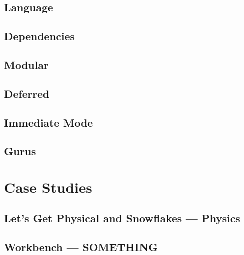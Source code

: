 \documentclass[conference,12pt]{IEEEtran}
\begin{document}
\subsection{Language}

\subsection{Dependencies}

\subsection{Modular}

\subsection{Deferred}

\subsection{Immediate Mode}

\subsection{Gurus} %


\section{Case Studies}

\subsection{Let's Get Physical and Snowflakes --- Physics}

\subsection{Workbench --- SOMETHING} %
\end{document}
